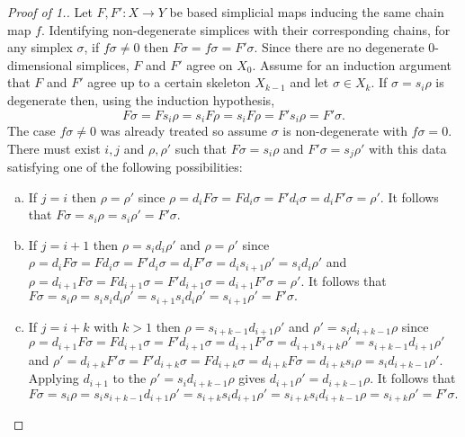 \documentclass[main.tex]{subfiles}
\begin{document}
\begin{proof}[Proof of 1.]
Let $F,F':X\to Y$  be based simplicial maps inducing the same chain map $f$. Identifying non-degenerate simplices with their corresponding chains, for any simplex $\sigma$, if $f\sigma\neq0$ then $F\sigma=f\sigma=F'\sigma$. Since there are no degenerate $0$-dimensional simplices, $F$ and $F'$ agree on $X_0$. Assume for an induction argument that $F$ and $F'$ agree up to a certain skeleton $X_{k-1}$ and let $\sigma\in X_k$. If $\sigma=s_i\rho$ is degenerate then, using the induction hypothesis,
$$F\sigma=Fs_i\rho=s_iF\rho=s_iF\rho=F's_i\rho=F'\sigma.$$
The case $f\sigma\neq0$ was already treated so assume $\sigma$ is non-degenerate with $f\sigma=0$. There must exist $i,j$ and $\rho,\rho'$ such that $F\sigma=s_i\rho$ and $F'\sigma=s_j\rho'$ with this data satisfying one of the following possibilities:

\begin{enumerate}[a)]
\item If $j=i$ then $\rho=\rho'$ since $\rho=d_iF\sigma=Fd_i\sigma=F'd_i\sigma=d_iF'\sigma=\rho'$. It follows that $F\sigma=s_i\rho=s_i\rho'=F'\sigma$.

\item If $j=i+1$ then $\rho=s_id_i\rho'$ and $\rho=\rho'$ since $\rho=d_iF\sigma=Fd_i\sigma=F'd_i\sigma=d_iF'\sigma=d_is_{i+1}\rho'=s_id_i\rho'$ and $\rho=d_{i+1}F\sigma=Fd_{i+1}\sigma=F'd_{i+1}\sigma=d_{i+1}F'\sigma=\rho'$. It follows that $F\sigma=s_i\rho=s_is_id_i\rho'=s_{i+1}s_id_i\rho'=s_{i+1}\rho'=F'\sigma.$

\item If $j=i+k$ with $k>1$ then $\rho=s_{i+k-1}d_{i+1}\rho'$ and $\rho'=s_{i}d_{i+k-1}\rho$ since $\rho=d_{i+1}F\sigma=Fd_{i+1}\sigma=F'd_{i+1}\sigma=d_{i+1}F'\sigma=d_{i+1}s_{i+k}\rho'=s_{i+k-1}d_{i+1}\rho'$ and $\rho'=d_{i+k}F'\sigma=F'd_{i+k}\sigma=Fd_{i+k}\sigma=d_{i+k}F\sigma=d_{i+k}s_{i}\rho=s_{i}d_{i+k-1}\rho'$. Applying $d_{i+1}$ to the $\rho'=s_{i}d_{i+k-1}\rho$ gives $d_{i+1}\rho'=d_{i+k-1}\rho$. It follows that $F\sigma=s_i\rho=s_is_{i+k-1}d_{i+1}\rho'=s_{i+k}s_id_{i+1}\rho'=s_{i+k}s_id_{i+k-1}\rho=s_{i+k}\rho'=F'\sigma.$
\end{enumerate}
\end{proof}
\end{document}
